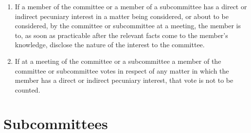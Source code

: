 \documentclass[a4paper,11pt]{article}
\begin{document}
\begin{enumerate}
	\item If a member of the committee or a member of a subcommittee has a direct or indirect pecuniary interest in a matter being considered, or about to be considered, by the committee or subcommittee at a meeting, the member is to, as soon as practicable after the relevant facts come to the member's knowledge, disclose the nature of the interest to the committee.
	\item If at a meeting of the committee or a subcommittee a member of the committee or subcommittee votes in respect of any matter in which the member has a direct or indirect pecuniary interest, that vote is not to be counted.
\end{enumerate}

\section{Subcommittees}
\label{rule:subcommittee}
\end{document}
